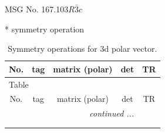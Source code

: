 \documentclass[fleqn,8pt]{jsarticle}
\begin{document}
\setcounter{MaxMatrixCols}{32}

\renewcommand{\tablename}{Table~}
\renewcommand{\figurename}{Figure~}
\begin{center}
\LARGE
MSG No. 167.103\quad$R\bar{3}c$
\end{center}
* symmetry operation
\renewcommand{\arraystretch}{1.3}
\begin{longtable}{ccccc}
\caption{Symmetry operations for 3d polar vector.}
 \\
 \hline \hline
No. & tag & matrix (polar) & det & TR \\ \hline \endfirsthead

\multicolumn{4}{l}{\tablename\ \thetable{}} \\
 \hline \hline
No. & tag & matrix (polar) & det & TR \\ \hline \endhead

 \hline \hline
\multicolumn{4}{r}{\footnotesize\it continued ...} \\ \endfoot

 \hline \hline
\multicolumn{4}{r}{} \\ \endlastfoot


\end{longtable}
\end{document}
